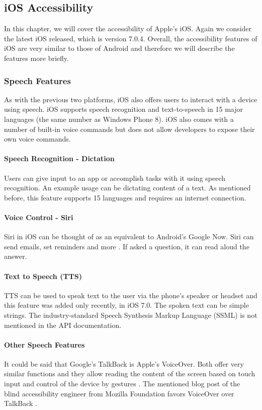 \subsection{iOS Accessibility}
In this chapter, we will cover the accessibility of Apple's iOS. Again we consider the latest iOS released, which is version 7.0.4. Overall, the accessibility features of iOS are very similar to those of Android and therefore we will describe the features more briefly.

\subsubsection{Speech Features}
As with the previous two platforms, iOS also offers users to interact with a device using speech. iOS supports speech recognition and text-to-speech in 15 major languages (the same number as Windows Phone 8).
iOS also comes with a number of built-in voice commands \cite{iosAccbility} but does not allow developers to expose their own voice commands.

\paragraph{Speech Recognition - Dictation}
Users can give input to an app or accomplish tasks with it using speech recognition. An example usage can be dictating content of a text. As mentioned before, this feature supports 15 languages and requires an internet connection.

\paragraph{Voice Control - Siri}
Siri in iOS can be thought of as an equivalent to Android's Google Now. Siri can send emails, set reminders and more \cite{iosAccbility}. If asked a question, it can read aloud the answer. 

\paragraph{Text to Speech (TTS)}
TTS can be used to speak text to the user via the phone's speaker or headset and this feature was added only recently, in iOS 7.0. The spoken text can be simple strings. The industry-standard Speech Synthesis Markup Language (SSML) is not mentioned in the API documentation.

\paragraph{Other Speech Features}
It could be said that Google's TalkBack is Apple's VoiceOver. Both offer very similar functions and they allow reading the content of the screen based on touch input and control of the device by gestures \cite{iosVoiceOver}.
The mentioned blog post of the blind accessibility engineer from Mozilla Foundation favors VoiceOver over TalkBack \cite{mozillaguy}.

